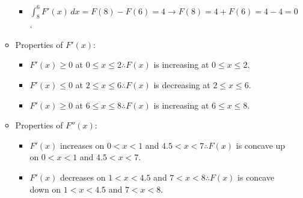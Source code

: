 \documentclass[10pt, letterpaper]{report}
\begin{document}
\begin{enumerate}
\begin{itemize}
\begin{itemize}
          \item{$\int_{8}^{6}{F'(x)}\,dx=
            F(8)-F(6)=4\rightarrow
            F(8)=4+F(6)=4-4=0$.} \\

        \end{itemize}
        \item{Properties of $F'(x)$:}
        \begin{itemize}
          \item{$F'(x)\geq 0$ at $0\leq x\leq 2\therefore F(x)$ is increasing at $0\leq x\leq 2$.} \\

          \item{$F'(x)\leq 0$ at $2\leq x\leq 6\therefore F(x)$ is decreasing at $2\leq x\leq 6$.} \\

          \item{$F'(x)\geq 0$ at $6\leq x\leq 8\therefore F(x)$ is increasing at $6\leq x\leq 8$.} \\
        \end{itemize}
        \item{Properties of $F''(x)$:}
        \begin{itemize}
          \item{$F'(x)$ increases on $0<x<1$ and $4.5<x<7\therefore F(x)$ is  concave up on $0<x<1$ and $4.5<x<7$.} \\

          \item{$F'(x)$ decreases on $1<x<4.5$ and $7<x<8\therefore F(x)$ is  concave down on $1<x<4.5$ and $7<x<8$.} \\

        \end{itemize}
      \end{itemize}

  \end{enumerate}
\end{document}
